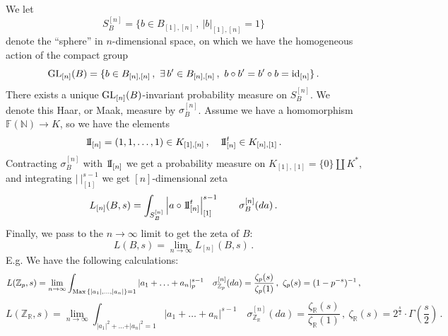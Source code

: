 \documentclass[leqno]{article}
\def\un{{\rm 1\mkern-4mu I}}
\numberwithin{equation}{section}
\begin{document}
We let
\begin{equation}
\label{eq59}
S_B^{[n]} = \{ b \in B_{[1],[n]} \, , \ \vert b \vert_{[1],[n]} = 1 \}
\end{equation}
denote the ``sphere'' in $n$-dimensional space, on which we have the homogeneous action of the compact group
\begin{equation}
\label{eq510}
{\rm GL}_{[n]} (B) = \{ b \in B_{[n],[n]} \, , \ \exists \, b' \in B_{[n],[n]} \, , \ b \circ b' = b' \circ b = {\rm id}_{[n]} \} \, .
\end{equation}
There exists a unique ${\rm GL}_{[n]} (B)$-invariant probability measure on $S_B^{[n]}$. We denote this Haar, or Maak, measure by $\sigma_B^{[n]}$. Assume we have a homomorphism ${\mathbb F} ({\mathbb N}) \to K$, so we have the elements
\begin{equation}
\label{eq511}
\un_{[n]} = (1,1,\ldots , 1) \in K_{[1],[n]} \, , \quad \un_{[n]}^t \in K_{[n],[1]} \, .
\end{equation}
Contracting $\sigma_B^{[n]}$ with $\un_{[n]}$ we get a probability measure on $K_{[1],[1]} = \{ 0 \} \amalg K^*$, and integrating $\vert \ \vert_{[1]}^{s-1}$ we get $[n]$-dimensional zeta
\begin{equation}
\label{eq512}
L_{[n]} (B,s) = \int_{S_B^{[n]}} \left\vert a \circ \un_{[n]}^t \right\vert_{[1]}^{s-1} \qquad \sigma_B^{[n]} (da) \, .
\end{equation}
Finally, we pass to the $n \to \infty$ limit to get the zeta of $B$:
\begin{equation}
\label{eq513}
L(B,s) = \lim_{n \to \infty} L_{[n]} (B,s) \, .
\end{equation}
E.g. We have the following calculations:
\begin{equation}
\label{eq514}
L ({\mathbb Z}_p , s) = \lim_{n \to \infty} \int_{{\rm Max} \, \{\vert a_1 \vert , \ldots , \vert a_n \vert\}=1} \vert a_1 + \ldots + a_n \vert_p^{s-1} \quad \sigma_{{\mathbb Z}_p}^{[n]} (da) = \frac{\zeta_p (s)}{\zeta_p (1)} \, , \ \zeta_p (s) = (1-p^{-s})^{-1} \, ,
\end{equation}
\begin{equation}
\label{eq515}
L ({\mathbb Z}_{\mathbb R} , s) = \lim_{n \to \infty} \int_{\vert a_1 \vert^2 + \ldots + \vert a_n \vert^2=1} \vert a_1 + \ldots + a_n \vert^{s-1} \quad \sigma_{{\mathbb Z}_{\mathbb R}}^{[n]} (da) = \frac{\zeta_{\mathbb R} (s)}{\zeta_{\mathbb R} (1)} \, , \ \zeta_{\mathbb R} (s) = 2^{\frac s2} \cdot \Gamma \left( \frac s2 \right) \, . 
\end{equation}
\end{document}
